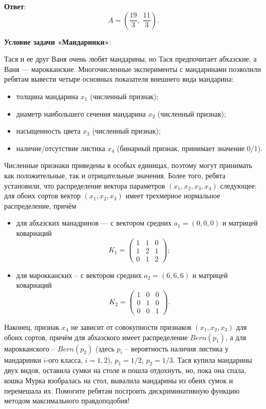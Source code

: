 \documentclass[pract]{SCWorks}
\begin{document}
    \textbf{Ответ}:
    \[
    \boxed{A = \left(\dfrac{19}{3},\; \dfrac{11}{3}\right)}.
    \]

    \textbf{Условие задачи «Мандаринки»}:

    Тася и ее друг Ваня очень любят мандарины, но Тася предпочитает абхазские, а Ваня — марокканские.
    Многочисленные эксперименты с мандаринами позволили ребятам вывести четыре основных показателя внешнего вида мандарина:
    \begin{itemize}
        \item[$\bullet$] толщина мандарина $x_1$ (численный признак);
        \item[$\bullet$] диаметр наибольшего сечения мандарина $x_2$ (численный признак);
        \item[$\bullet$] насыщенность цвета $x_3$ (численный признак);
        \item[$\bullet$] наличие/отсутствие листика $x_4$ (бинарный признак, принимает значение 0/1).
    \end{itemize}
    Численные признаки приведены в особых единицах, поэтому могут принимать как положительные, так и отрицательные значения.
    Более того, ребята установили, что распределение вектора параметров $(x_1, x_2, x_3, x_4)$ следующее: для обоих сортов вектор $(x_1, x_2, x_3)$ имеет трехмерное нормальное распределение, причём
     \begin{itemize}
        \item[$\bullet$] для абхазских манадринов — с вектором средних $a_1 = (0, 0 , 0)$ и матрицей ковариаций
        \[
        K_1 = \begin{pmatrix} 1 & 1 & 0 \\ 1 & 2 & 1 \\ 0 & 1 & 2 \end{pmatrix};
        \]
        \item[$\bullet$] для марокканских – с вектором средних $a_2 = (6, 6, 6)$ и матрицей ковариаций
        \[
        K_2 = \begin{pmatrix} 1 & 0 & 0 \\ 0 & 1 & 0 \\ 0 & 0 & 1 \end{pmatrix}.
        \]
    \end{itemize}
    Наконец, признак $x_4$ не зависит от совокупности признаков $(x_1, x_2, x_3)$ для обоих сортов, причём для абхазского имеет распределение $Bern(p_1)$, а для марокканского – $Bern(p_2)$ (здесь $p_i$ – вероятность наличия листика у мандаринки $i$-ого класса, $i = 1, 2$), $p_1 = 1/2$, $p_2 = 1/3$.
    Тася купила мандарины двух видов, оставила сумки на столе и пошла отдохнуть, но, пока она спала, кошка Мурка взобралась на стол, вывалила мандарины из обеих сумок и перемешала их.
    Помогите ребятам построить дискриминативную функцию методом максимального правдоподобия!
\end{document}
